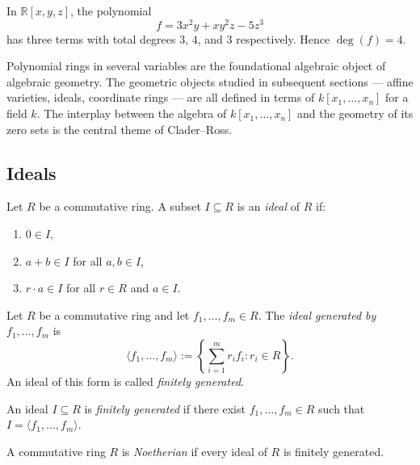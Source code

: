\begin{example}
In $\mathbb{R}[x,y,z]$, the polynomial
\[
f = 3x^2 y + xy^2 z - 5z^3
\]
has three terms with total degrees $3$, $4$, and $3$ respectively.
Hence $\deg(f) = 4$.
\end{example}

\begin{remark}
Polynomial rings in several variables are the foundational
algebraic object of algebraic geometry.
The geometric objects studied in subsequent sections ---
affine varieties, ideals, coordinate rings ---
are all defined in terms of $k[x_1, \dots, x_n]$
for a field $k$.
The interplay between the algebra of $k[x_1,\dots,x_n]$
and the geometry of its zero sets is the central theme
of Clader--Ross.
\end{remark}

\subsection{Ideals}

\begin{definition}[Ideal]
Let $R$ be a commutative ring.
A subset $I \subseteq R$ is an \emph{ideal} of $R$ if:
\begin{enumerate}
\item $0 \in I$,
\item $a + b \in I$ for all $a, b \in I$,
\item $r \cdot a \in I$ for all $r \in R$ and $a \in I$.
\end{enumerate}
\end{definition}

\begin{definition}
Let $R$ be a commutative ring and let $f_1, \dots, f_m \in R$.
The \emph{ideal generated by} $f_1, \dots, f_m$ is
\[
\langle f_1, \dots, f_m \rangle
:= \left\{ \sum_{i=1}^m r_i f_i : r_i \in R \right\}.
\]
An ideal of this form is called \emph{finitely generated}.
\end{definition}

\begin{definition}
An ideal $I \subseteq R$ is \emph{finitely generated} if there exist
$f_1, \dots, f_m \in R$ such that $I = \langle f_1, \dots, f_m \rangle$.
\end{definition}

\begin{definition}
A commutative ring $R$ is \emph{Noetherian} if every ideal of $R$
is finitely generated.
\end{definition}

